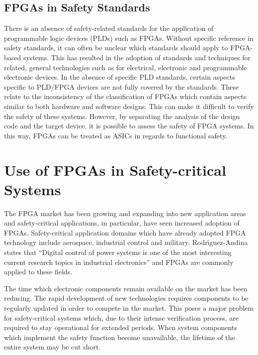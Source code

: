 \subsection{FPGAs in Safety Standards}
  
There is an absence of safety-related standards for the application of programmable logic devices (PLDs) such as FPGAs\cite{DaSilva,Conmy,Bernardeschi}. Without specific reference in safety standards, it can often be unclear which standards should apply to FPGA-based systems\cite{DaSilva,Conmy,Borcsok}. This has resulted in the adoption of standards and techniques for related, general technologies such as for electrical, electronic and programmable electronic devices\cite{Bernardeschi}. In the absence of specific PLD standards, certain aspects specific to PLD/FPGA devices are not fully covered by the standards\cite{DaSilva}. These relate to the inconsistency of the classification of FPGAs which contain aspects similar to both hardware and software designs\cite{Conmy,DaSilva}. 
This can make it difficult to verify the safety of these systems\cite{DaSilva,Conmy}. %
However, by separating the analysis of the design code and the target device, it is possible to assess the safety of FPGA systems\cite{HayekSRAM, Borcsok}. In this way, FPGAs can be treated as ASICs in regards to functional safety\cite{HayekSRAM, HayekSafety, Bernardeschi}.
  
\section{Use of FPGAs in Safety-critical Systems}

The FPGA market has been growing and expanding into new application areas\cite{Foster} and safety-critical applications, in particular, have seen increased adoption of FPGAs\cite{Foster,DaSilva,Conmy,HayekSafety,HayekSRAM,Bernardeschi,Cilardo, SalewskiExploring}. Safety-critical application domains which have already adopted FPGA technology include aerospace, industrial control and military\cite{Foster,Bernardeschi}. Rodr{\'\i}guez-Andina states that ``Digital control of power systems is one of the most interesting current research topics in industrial electronics''\cite{Rodriguez} and FPGAs are commonly applied to these fields\cite{MonmassonDesign, Gomes, Dubey, deCastro}. 

The time which electronic components remain available on the market has been reducing\cite{Guzman-Miranda}. The rapid development of new technologies requires components to be regularly updated in order to compete in the market\cite{Sandborn}. This poses a major problem for safety-critical systems which, due to their intense verification process, are required to stay operational for extended periods\cite{Guzman-Miranda, SalewskiFaultHandling}. When system components which implement the safety function become unavailable, the lifetime of the entire system may be cut short\cite{Guzman-Miranda}. 

